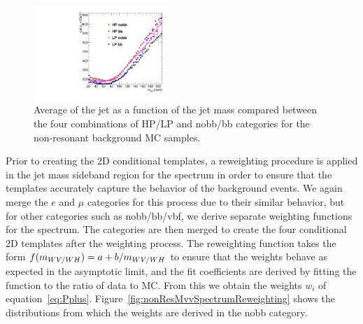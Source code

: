 \begin{figure}[htbp]
  \centering
  \includegraphics[width=0.45\textwidth]{fig/2Dfit/nonRes_corr.pdf}
  \caption{
    Average \pt of the jet as a function of the jet mass \MJ compared between the four combinations of HP/LP and nobb/bb categories for the non-resonant background MC samples.
  }
  \label{fig:nonRes2DCorr}
\end{figure}

Prior to creating the 2D conditional templates, a reweighting procedure is applied in the jet mass sideband region for the \MVV spectrum in order to ensure that the templates accurately capture the behavior of the background events.
We again merge the $e$ and $\mu$ categories for this process due to their similar behavior, but for other categories such as nobb/bb/vbf, we derive separate weighting functions for the \MVV spectrum.
The categories are then merged to create the four conditional 2D templates after the weighting process.
The reweighting function takes the form $f(m_{WV/WH})=a+b/m_{WV/WH}$ to ensure that the weights behave as expected in the asymptotic limit, and the fit coefficients are derived by fitting the function to the ratio of data to MC.
From this we obtain the weights $w_i$ of equation~\ref{eq:Pplus}.
Figure~\ref{fig:nonResMvvSpectrumReweighting} shows the \MVV distributions from which the weights are derived in the nobb category.


